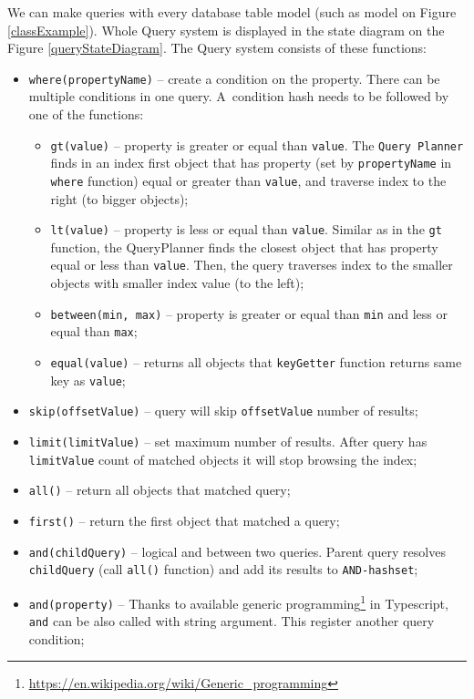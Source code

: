 We can make queries with every database table model (such as model on Figure \ref{classExample}). Whole Query system is displayed in the state diagram on the Figure \ref{queryStateDiagram}. The Query system consists of these functions: 
\begin{itemize}
    \item \texttt{where(propertyName)} -- create a condition on the property. There can be multiple conditions in one query. A~condition hash needs to be followed by one of the functions: 
    \begin{itemize}
        \item \texttt{gt(value)} -- property is greater or equal than \texttt{value}. The \texttt{Query Planner} finds in an index first object that has property (set by \texttt{propertyName} in \texttt{where} function) equal or greater than \texttt{value}, and traverse index to the right (to bigger objects);
        \item \texttt{lt(value)} -- property is less or equal than \texttt{value}. Similar as in the \texttt{gt} function, the QueryPlanner finds the closest object that has property equal or less than \texttt{value}. Then, the query traverses index to the smaller objects with smaller index value (to the left);
        \item \texttt{between(min, max)} -- property is greater or equal than \texttt{min} and less or equal than \texttt{max};
        \item \texttt{equal(value)} -- returns all objects that \texttt{keyGetter} function returns same key as \texttt{value};
    \end{itemize}
    \item \texttt{skip(offsetValue)} -- query will skip \texttt{offsetValue} number of results;
    \item \texttt{limit(limitValue)} -- set maximum number of results. After query has \texttt{limitValue} count of matched objects it will stop browsing the index;
    \item \texttt{all()} -- return all objects that matched query;
    \item \texttt{first()} -- return the first object that matched a query;
    \item \texttt{and(childQuery)} -- logical and between two queries. Parent query resolves \texttt{childQuery} (call \texttt{all()} function) and add its results to \texttt{AND-hashset};
    \item \texttt{and(property)} -- Thanks to available generic programming\footnote{\url{https://en.wikipedia.org/wiki/Generic_programming}} in Typescript, \texttt{and} can be also called with string argument. This register another query condition;

\end{itemize}
